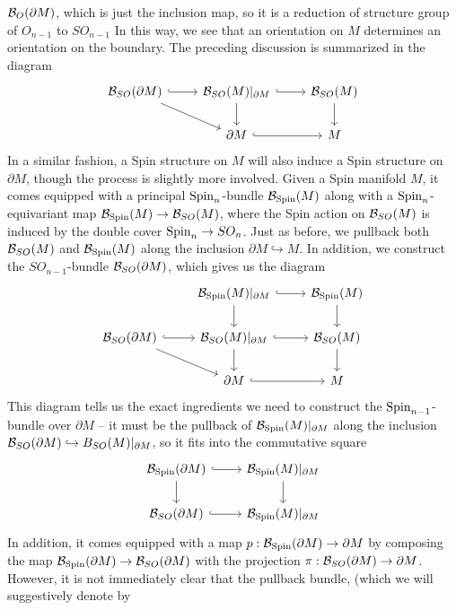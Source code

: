 $\mathcal{B}_O(\partial M)$, which is just the inclusion map, so it is a reduction
of structure group of $O_{n-1}$ to $SO_{n-1}$ In this way, we see that an
orientation on $M$ determines an orientation on the boundary. The preceding
discussion is summarized in the diagram
\[\begin{tikzcd}
\B_{SO}(\partial M) \ar[r, hookrightarrow] \ar[dr] &
\B_{SO}(M)\vert_{\partial M} \ar[d] \ar[r, hookrightarrow] & \B_{SO}(M) \ar[d] \\
& \partial M \ar[r, hookrightarrow] & M
\end{tikzcd}\]
In a similar fashion, a Spin structure on $M$ will also induce a Spin structure
on $\partial M$, though the process is slightly more involved. Given a Spin
manifold $M$, it comes equipped with a principal $\mathrm{Spin}_n$-bundle $\mathcal{B}_{\mathrm{Spin}}(M)$
along with a $\mathrm{Spin}_n$-equivariant map $\mathcal{B}_{\mathrm{Spin}}(M) \to \mathcal{B}_{SO}(M)$, where
the Spin action on $\mathcal{B}_{SO}(M)$ is induced by the double cover $\mathrm{Spin}_n \to SO_n$.
Just as before, we pullback both $\mathcal{B}_{SO}(M)$ and $\mathcal{B}_{\mathrm{Spin}}(M)$ along
the inclusion $\partial M \hookrightarrow M$. In addition, we construct the
$SO_{n-1}$-bundle $\mathcal{B}_{SO}(\partial M)$, which gives us the diagram
\[\begin{tikzcd}
&\B_{\Spin}(M)\vert_{\partial M} \ar[r, hookrightarrow]\ar[d] & \B_{\Spin}(M) \ar[d] \\
\B_{SO}(\partial M) \ar[r, hookrightarrow] \ar[dr] &\B_{SO}(M)\vert_{\partial M}
\ar[d] \ar[r, hookrightarrow] & \B_{SO}(M) \ar[d] \\
&\partial M \ar[r, hookrightarrow] & M
\end{tikzcd}\]
This diagram tells us the exact ingredients we need to construct the
$\mathrm{Spin}_{n-1}$-bundle over $\partial M$ -- it must be the pullback of
$\mathcal{B}_{\mathrm{Spin}}(M)\vert_{\partial M}$ along the inclusion
$\mathcal{B}_{SO}(\partial M) \hookrightarrow B_{SO}(M)\vert_{\partial M}$, so it fits
into the commutative square
\[\begin{tikzcd}
\B_{\Spin}(\partial M) \ar[d] \ar[r, hookrightarrow] &
\B_{\Spin}(M)\vert_{\partial M}\ar[d] \\
\B_{SO}(\partial M) \ar[r, hookrightarrow] & \B_{\Spin}(M)\vert_{\partial M}
\end{tikzcd}\]
In addition, it comes equipped with a map $p : \mathcal{B}_{\mathrm{Spin}}(\partial M) \to \partial M$
by composing the map $\mathcal{B}_{\mathrm{Spin}}(\partial M) \to \mathcal{B}_{SO}(\partial M)$ with the projection
$\pi : \mathcal{B}_{SO}(\partial M) \to \partial M$. However, it is not immediately clear
that the pullback bundle, (which we will suggestively denote by
